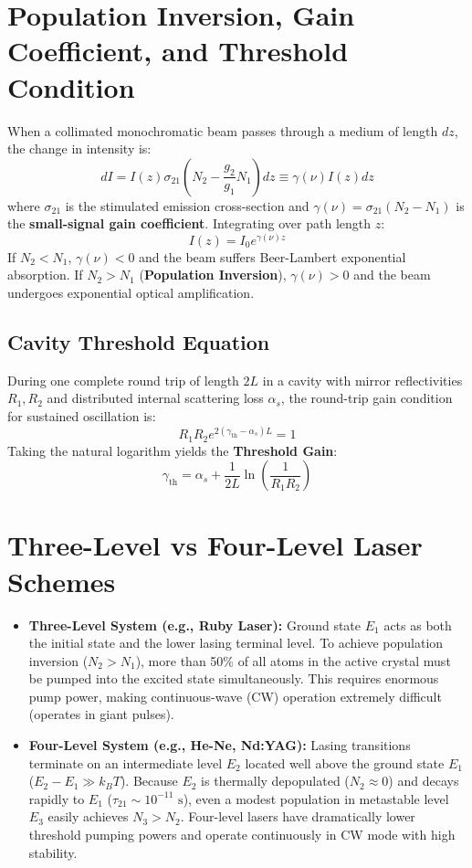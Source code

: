 \section{Population Inversion, Gain Coefficient, and Threshold Condition}
When a collimated monochromatic beam passes through a medium of length $dz$, the change in intensity is:
\begin{equation}
dI = I(z) \sigma_{21} \left( N_2 - \frac{g_2}{g_1} N_1 \right) dz \equiv \gamma(\nu) I(z) dz
\end{equation}
where $\sigma_{21}$ is the stimulated emission cross-section and $\gamma(\nu) = \sigma_{21}(N_2 - N_1)$ is the \textbf{small-signal gain coefficient}.
Integrating over path length $z$:
\begin{equation}
I(z) = I_0 e^{\gamma(\nu) z}
\end{equation}
If $N_2 < N_1$, $\gamma(\nu) < 0$ and the beam suffers Beer-Lambert exponential absorption. If $N_2 > N_1$ (\textbf{Population Inversion}), $\gamma(\nu) > 0$ and the beam undergoes exponential optical amplification.

\subsection{Cavity Threshold Equation}
During one complete round trip of length $2L$ in a cavity with mirror reflectivities $R_1, R_2$ and distributed internal scattering loss $\alpha_s$, the round-trip gain condition for sustained oscillation is:
\begin{equation}
R_1 R_2 e^{2(\gamma_{\text{th}} - \alpha_s)L} = 1
\end{equation}
Taking the natural logarithm yields the \textbf{Threshold Gain}:
\begin{equation}
\gamma_{\text{th}} = \alpha_s + \frac{1}{2L}\ln\left(\frac{1}{R_1 R_2}\right)
\end{equation}

\section{Three-Level vs Four-Level Laser Schemes}
\begin{itemize}[leftmargin=*,itemsep=3pt]
    \item \textbf{Three-Level System (e.g., Ruby Laser):} Ground state $E_1$ acts as both the initial state and the lower lasing terminal level. To achieve population inversion ($N_2 > N_1$), more than 50\% of all atoms in the active crystal must be pumped into the excited state simultaneously. This requires enormous pump power, making continuous-wave (CW) operation extremely difficult (operates in giant pulses).
    \item \textbf{Four-Level System (e.g., He-Ne, Nd:YAG):} Lasing transitions terminate on an intermediate level $E_2$ located well above the ground state $E_1$ ($E_2 - E_1 \gg k_B T$). Because $E_2$ is thermally depopulated ($N_2 \approx 0$) and decays rapidly to $E_1$ ($\tau_{21} \sim 10^{-11}\text{ s}$), even a modest population in metastable level $E_3$ easily achieves $N_3 > N_2$. Four-level lasers have dramatically lower threshold pumping powers and operate continuously in CW mode with high stability.
\end{itemize}


